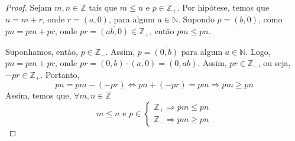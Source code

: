 \begin{proof}
Sejam $m,n\in \mathbb{Z}$ tais que $m\le n$ e $p\in\mathbb{Z}_+$. Por hipótese, temos que $n=m+r$, onde $r=\overline{(a,0)}$, para algum $a \in \mathbb{N}$. Supondo $p=\overline{(b,0)}$, como $pn=pm+pr$, onde $pr=\overline{(ab,0)}\in \mathbb{Z}_+$, então $pm\le pn$. \par 
Suponhamos, então, $p\in\mathbb{Z}_-$. Assim, $p=\overline{(0,b)}$ para algum $a \in \mathbb{N}$. Logo, $pn=pm+pr$, onde $pr=\overline{(0,b)}\cdot \overline{(a,0)}=\overline{(0,ab)}$. Assim, $pr \in \mathbb{Z}_-$, ou seja, $-pr \in \mathbb{Z}_+$. Portanto, \[pn=pm-(-pr) \Leftrightarrow pn+(-pr)=pm \Rightarrow pm \ge pn\]
Assim, temos que, $\forall m,n \in \mathbb{Z}$
\[m\le n \textrm{ e } p \in \begin{cases}
\mathbb{Z}_+ \Rightarrow pm \le pn \\
\mathbb{Z}_- \Rightarrow pm \ge pn
\end{cases}\]
\end{proof}

